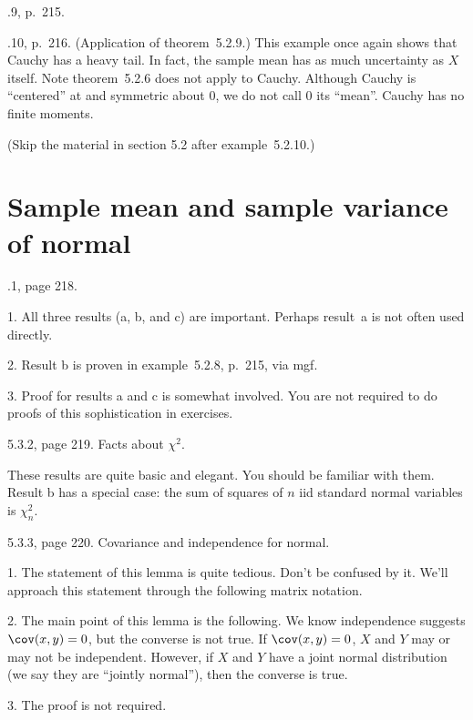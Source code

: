 \documentclass[12pt]{article}
\begin{document}
.9, p.~215.

.10, p.~216. (Application of theorem~5.2.9.)
    This example once again shows that Cauchy has a heavy tail.
    In fact, the sample mean has as much uncertainty as $X$ itself.
    Note theorem~5.2.6 does not apply to Cauchy.
    Although Cauchy is ``centered'' at and symmetric about 0,
    we do not call 0 its ``mean''.
    Cauchy has no finite moments.

(Skip the material in section 5.2 after example~5.2.10.)


\section{Sample mean and sample variance of normal}

.1, page 218.

\alert
1. All three results (a, b, and c) are important.
    Perhaps result~a is not often used directly.

2. Result b is proven in example~5.2.8, p.~215, via mgf.

3. Proof for results a and c is somewhat involved.
   You are not required to do proofs of this sophistication in exercises.

\alert[Lemma]%
5.3.2, page 219.
Facts about $\chi^2$.

\alert These results are quite basic and elegant.
    You should be familiar with them.
    Result b has a special case:
    the sum of squares of $n$ iid standard normal variables
    is $\chi^2_n$.


\alert[Lemma]%
5.3.3, page 220.
Covariance and independence for normal.

\alert
1. The statement of this lemma is quite tedious.
Don't be confused by it. We'll approach this statement
through the following matrix notation.

2. The main point of this lemma is the following.
We know independence suggests $\cov(x,y) = 0$,
but the converse is not true.
If $\cov(x,y) = 0$, $X$ and $Y$ may or may not be independent.
However, if $X$ and $Y$ have a joint normal distribution
(we say they are ``jointly normal''), then the converse is true.

3. The proof is not required.
\end{document}
